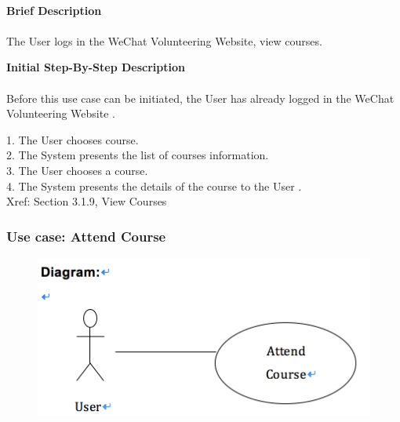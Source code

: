 \documentclass[12pt]{report}
\begin{document}
\paragraph{}
\begin{flushleft}
\textbf{Brief Description }
\paragraph{}
The User logs in the WeChat Volunteering Website, view courses.\\

\begin{flushleft}
\textbf{Initial Step-By-Step Description }
\paragraph{}
Before this use case can be initiated, the User has already logged in the WeChat Volunteering Website .

\begin{flushleft}
1.	The User chooses course. \\
2.	The System presents the list of courses information. \\
3.	The User chooses a course. \\
4.	The System presents the details of the course to the User . \\
Xref: Section 3.1.9, View Courses

\end{flushleft}
\end{flushleft}
\end{flushleft}

\newpage
\subsubsection{Use case:  Attend Course }

\begin{figure}[!htb]
  \includegraphics{10.PNG}
\end{figure}
\end{document}
